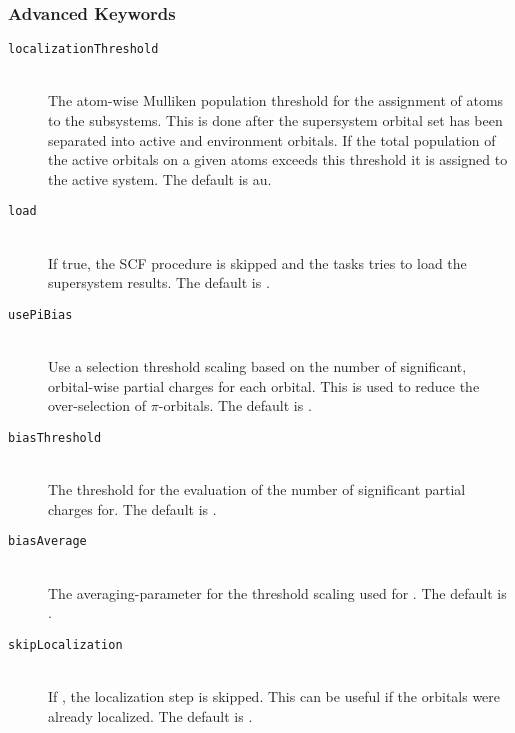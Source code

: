 \subsubsection{Advanced Keywords}
\begin{description}
    \item [\texttt{localizationThreshold}]\hfill \\
    The atom-wise Mulliken population threshold for the assignment of atoms to the subsystems. This is done
    after the supersystem orbital set has been separated into active and environment orbitals. If the total
    population of the active orbitals on a given atoms exceeds this threshold it is assigned to the active
    system. The default is  au.
    \item [\texttt{load}]\hfill \\
    If true, the SCF procedure is skipped and the tasks tries to load the supersystem results. The default
    is .
    \item [\texttt{usePiBias}]\hfill \\
    Use a selection threshold scaling based on the number of significant, orbital-wise partial charges for
    each orbital. This is used to reduce the over-selection of $\pi$-orbitals. The default is .
    \item [\texttt{biasThreshold}]\hfill \\
    The threshold for the evaluation of the number of significant partial charges for. The default is
    .
    \item [\texttt{biasAverage}]\hfill \\
    The averaging-parameter for the threshold scaling used for .
    The default is .
    \item [\texttt{skipLocalization}]\hfill \\
    If , the localization step is skipped. This can be useful if the orbitals were already
    localized. The default is .
 \end{description}
